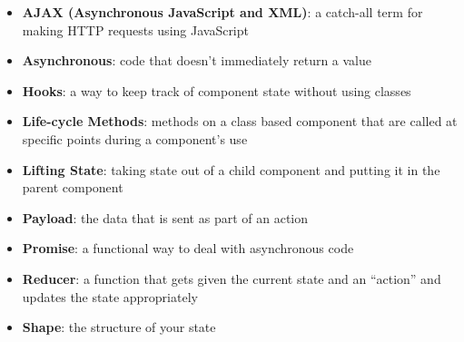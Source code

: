 \begin{itemize}[leftmargin=*]
    \item
        \textbf{AJAX (Asynchronous JavaScript and XML)}:
        a catch-all term for making HTTP requests using JavaScript
    \item
        \textbf{Asynchronous}:
        code that doesn't immediately return a value
    \item
        \textbf{Hooks}:
        a way to keep track of component state without using classes
    \item
        \textbf{Life-cycle Methods}:
        methods on a class based component that are called at specific points during a component's use
    \item
        \textbf{Lifting State}:
        taking state out of a child component and putting it in the parent component
    \item
        \textbf{Payload}:
        the data that is sent as part of an action
    \item
        \textbf{Promise}:
        a functional way to deal with asynchronous code
    \item
        \textbf{Reducer}:
        a function that gets given the current state and an ``action'' and updates the state appropriately
    \item
        \textbf{Shape}:
        the structure of your state
\end{itemize}
